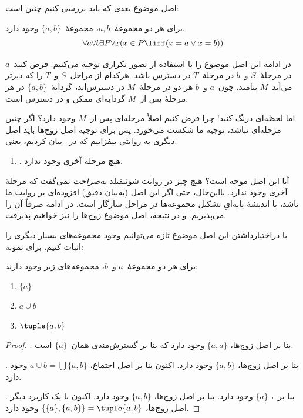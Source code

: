 \documentclass[../../../include/open-logic-section]{subfiles}
\begin{document}

اصل موضوع بعدی که باید بررسی کنیم چنین است:

\begin{axiom}[زوج‌ها]
برای هر دو مجموعهٔ~$a,b$، مجموعهٔ~$\{a,b\}$ وجود دارد.
\[
	\forall a \forall b \exists P \forall x (x \in P \liff (x = a \lor x = b))
\]
\end{axiom}

در ادامه این اصل موضوع را با استفاده از تصور تکراری توجیه می‌کنیم. فرض
کنید~$a$ در مرحلهٔ~$S$ و~$b$ در مرحلهٔ~$T$ در دسترس باشد. هرکدام از
مراحل~$S$ و~$T$ را که دیرتر می‌آید~$M$ بنامید. چون~$a$ و~$b$ هر دو در
مرحلهٔ~$M$ در دسترس‌اند، گردایهٔ~$\{a,b\}$ در هر مرحلهٔ پس از~$M$ گردایه‌ای
ممکن و در دسترس است.

اما لحظه‌ای درنگ کنید!{} چرا فرض کنیم اصلاً مرحله‌ای پس از~$M$ وجود دارد؟
اگر چنین مرحله‌ای نباشد، توجیه ما شکست می‌خورد. پس برای توجیه اصل زوج‌ها
باید اصل دیگری به روایتی بیفزاییم که در~ بیان
کردیم، یعنی:
\begin{enumerate}
	\item[] \stagessucc. هیچ مرحلهٔ آخری وجود ندارد.
\end{enumerate}
آیا این اصل موجه است؟ هیچ چیز در روایت شوئنفیلد \emph{به‌صراحت} نمی‌گفت
که مرحلهٔ آخری وجود ندارد. بااین‌حال، حتی اگر این اصل (به‌بیان دقیق) افزوده‌ای
بر روایت ما باشد، با اندیشهٔ پایه‌ایِ تشکیل مجموعه‌ها در مراحل سازگار است.
در ادامه صرفاً آن را می‌پذیریم. و در نتیجه، اصل موضوع زوج‌ها را نیز
خواهیم پذیرفت.

با دراختیارداشتن این اصل موضوع تازه می‌توانیم وجود مجموعه‌های بسیار دیگری
را اثبات کنیم. برای نمونه:

\begin{prop}
برای هر دو مجموعهٔ~$a$ و~$b$، مجموعه‌های زیر وجود دارند:
	\begin{enumerate}
		\item{} $\{a\}$
		\item{} $a \cup b$
		\item{} $\tuple{a, b}$
	\end{enumerate}
\end{prop}

\begin{proof}
. بنا بر اصل زوج‌ها، $\{a,a\}$ وجود دارد که بنا بر
گسترش‌مندی همان~$\{a\}$ است.

. بنا بر اصل زوج‌ها، $\{a,b\}$ وجود دارد. اکنون بنا بر
اصل اجتماع، $a \cup b = \bigcup\{a,b\}$ وجود دارد.

. بنا بر~، $\{a\}$ وجود دارد. بنا بر اصل
زوج‌ها، $\{a,b\}$ وجود دارد. اکنون با یک کاربرد دیگر اصل زوج‌ها،
$\{\{a\},\{a,b\}\} = \tuple{a,b}$ وجود دارد.
\end{proof}
\end{document}
